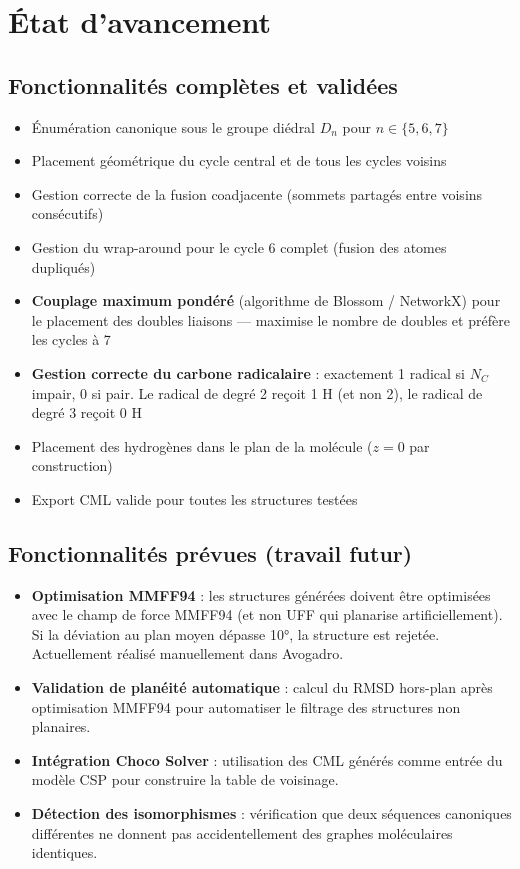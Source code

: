 \documentclass[a4paper,12pt]{article}
\begin{document}
\section{État d'avancement}

\subsection{Fonctionnalités complètes et validées}

\begin{itemize}[label=$\checkmark$]
  \item Énumération canonique sous le groupe diédral $D_n$ pour $n \in \{5, 6, 7\}$
  \item Placement géométrique du cycle central et de tous les cycles voisins
  \item Gestion correcte de la fusion coadjacente (sommets partagés entre voisins consécutifs)
  \item Gestion du wrap-around pour le cycle 6 complet (fusion des atomes dupliqués)
  \item \textbf{Couplage maximum pondéré} (algorithme de Blossom / NetworkX) pour le placement
    des doubles liaisons — maximise le nombre de doubles et préfère les cycles à 7
  \item \textbf{Gestion correcte du carbone radicalaire} : exactement 1 radical si $N_C$ impair,
    0 si pair. Le radical de degré 2 reçoit 1 H (et non 2), le radical de degré 3 reçoit 0 H
  \item Placement des hydrogènes dans le plan de la molécule ($z = 0$ par construction)
  \item Export CML valide pour toutes les structures testées
\end{itemize}

\subsection{Fonctionnalités prévues (travail futur)}

\begin{todo}
\begin{itemize}
  \item \textbf{Optimisation MMFF94} : les structures générées doivent être optimisées avec le
    champ de force MMFF94 (et non UFF qui planarise artificiellement). Si la déviation au plan
    moyen dépasse 10°, la structure est rejetée. Actuellement réalisé manuellement dans Avogadro.
  \item \textbf{Validation de planéité automatique} : calcul du RMSD hors-plan après optimisation
    MMFF94 pour automatiser le filtrage des structures non planaires.
  \item \textbf{Intégration Choco Solver} : utilisation des CML générés comme entrée du modèle
    CSP pour construire la table de voisinage.
  \item \textbf{Détection des isomorphismes} : vérification que deux séquences canoniques
    différentes ne donnent pas accidentellement des graphes moléculaires identiques.
\end{itemize}
\end{todo}
\end{document}
